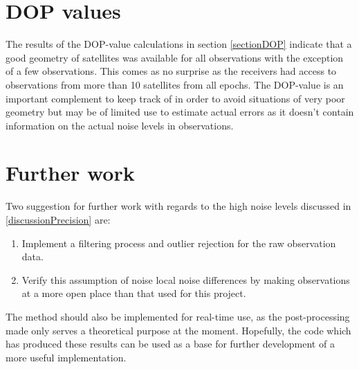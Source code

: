 \section{DOP values}
The results of the DOP-value calculations in section \ref{sectionDOP} indicate that a good geometry of satellites was available for all observations with the exception of a few observations. This comes as no surprise as the receivers had access to observations from more than 10 satellites from all epochs. The DOP-value is an important complement to keep track of in order to avoid situations of very poor geometry but may be of limited use to estimate actual errors as it doesn't contain information on the actual noise levels in observations.
\section{Further work}
Two suggestion for further work with regards to the high noise levels discussed in \ref{discussionPrecision} are:
\begin{enumerate}
\item Implement a filtering process and outlier rejection for the raw observation data.
\item Verify this assumption of noise local noise differences by making observations at a more open place than that used for this project.
\end{enumerate} 
The method should also be implemented for real-time use, as the post-processing made only serves a theoretical purpose at the moment. Hopefully, the code which has produced these results can be used as a base for further development of a more useful implementation.

